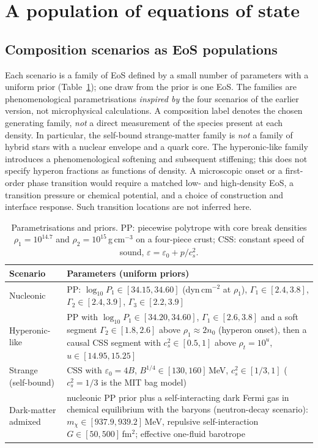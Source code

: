 \documentclass[11pt,a4paper]{article}
\begin{document}
\section{A population of equations of state}\label{sec:pop}
\subsection{Composition scenarios as EoS populations}
Each scenario is a family of EoS defined by a small number of parameters with a uniform prior (Table~\ref{tab:priors}); one draw from the prior is one EoS. The families are phenomenological parametrisations \emph{inspired by} the four scenarios of the earlier version, not microphysical calculations. A composition label denotes the chosen generating family, \emph{not} a direct measurement of the species present at each density. In particular, the self-bound strange-matter family is \emph{not} a family of hybrid stars with a nuclear envelope and a quark core. The hyperonic-like family introduces a phenomenological softening and subsequent stiffening; this does not specify hyperon fractions as functions of density. A microscopic onset or a first-order phase transition would require a matched low- and high-density EoS, a transition pressure or chemical potential, and a choice of construction and interface response. Such transition locations are not inferred here.
\begin{table}[t]\centering\small
\caption{Parametrisations and priors. PP: piecewise polytrope \citep{Read09} with core break densities $\rho_1=10^{14.7}$ and $\rho_2=10^{15}$\,g\,cm$^{-3}$ on a four-piece crust; CSS: constant speed of sound, $\varepsilon=\varepsilon_0+p/c_s^2$.}\label{tab:priors}
\begin{tabular}{>{\raggedright\arraybackslash}p{}p{}}\toprule
Scenario & Parameters (uniform priors)\\\midrule
Nucleonic & PP: $\log_{10}P_1\in[34.15,34.60]$ (dyn\,cm$^{-2}$ at $\rho_1$), $\Gamma_1\in[2.4,3.8]$, $\Gamma_2\in[2.4,3.9]$, $\Gamma_3\in[2.2,3.9]$\\
Hyperonic-like & PP with $\log_{10}P_1\in[34.20,34.60]$, $\Gamma_1\in[2.6,3.8]$ and a soft segment $\Gamma_2\in[1.8,2.6]$ above $\rho_1\approx2n_0$ (hyperon onset), then a causal CSS segment with $c_s^2\in[0.5,1]$ above $\rho_t=10^{u}$, $u\in[14.95,15.25]$\\
Strange (self-bound) & CSS with $\varepsilon_0=4B$, $B^{1/4}\in[130,160]$\,MeV, $c_s^2\in[1/3,1]$ ($c_s^2=1/3$ is the MIT bag model)\\
Dark-matter admixed & nucleonic PP prior plus a self-interacting dark Fermi gas in chemical equilibrium with the baryons (neutron-decay scenario): $m_\chi\in[937.9,939.2]$\,MeV, repulsive self-interaction $G\in[50,500]$\,fm$^2$; effective one-fluid barotrope\\\bottomrule\end{tabular}\end{table}
\end{document}
